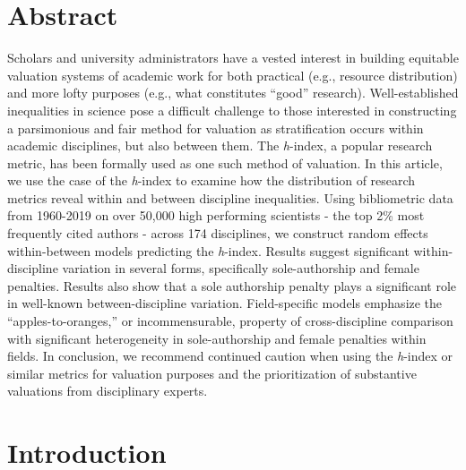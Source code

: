 \documentclass[
  10pt,
  letterpaper,
]{article}
\begin{document}
\newpage

\section*{Abstract}
Scholars and university administrators have a vested interest in
building equitable valuation systems of academic work for both practical
(e.g., resource distribution) and more lofty purposes (e.g., what
constitutes ``good'' research). Well-established inequalities in science
pose a difficult challenge to those interested in constructing a
parsimonious and fair method for valuation as stratification occurs
within academic disciplines, but also between them. The \emph{h}-index,
a popular research metric, has been formally used as one such method of
valuation. In this article, we use the case of the \emph{h}-index to
examine how the distribution of research metrics reveal within and
between discipline inequalities. Using bibliometric data from 1960-2019
on over 50,000 high performing scientists - the top 2\% most frequently
cited authors - across 174 disciplines, we construct random effects
within-between models predicting the \emph{h}-index. Results suggest
significant within-discipline variation in several forms, specifically
sole-authorship and female penalties. Results also show that a sole
authorship penalty plays a significant role in well-known
between-discipline variation. Field-specific models emphasize the
``apples-to-oranges,'' or incommensurable, property of cross-discipline
comparison with significant heterogeneity in sole-authorship and female
penalties within fields. In conclusion, we recommend continued caution
when using the \emph{h}-index or similar metrics for valuation purposes
and the prioritization of substantive valuations from disciplinary
experts.


\linenumbers
\section{Introduction}\label{introduction}
\end{document}
